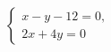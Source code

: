 \begin{ex}
	\begin{condition}
		\( \left\{
		\begin{array}{l}
			x-y-12=0,\\
			2x+4y=0
		\end{array}
		\right. \)
	\end{condition}
\end{ex}